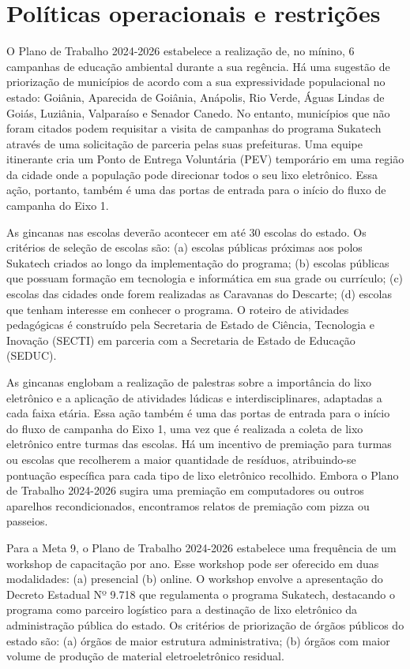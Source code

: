 \documentclass[
	12pt,				%
	openright,			%
	twoside,			%
	a4paper,			%
	english,			%
	french,				%
	spanish,			%
	brazil,				%
	]{abntex2}
\begin{document}
\section{Políticas operacionais e restrições}
O Plano de Trabalho 2024-2026 estabelece a realização de, no mínino, 6 campanhas de educação ambiental durante a sua regência. Há uma sugestão de priorização de municípios de acordo com a sua expressividade populacional no estado: Goiânia, Aparecida de Goiânia, Anápolis, Rio Verde, Águas Lindas de Goiás, Luziânia, Valparaíso e Senador Canedo. No entanto, municípios que não foram citados podem requisitar a visita de campanhas do programa Sukatech através de uma solicitação de parceria pelas suas prefeituras. Uma equipe itinerante cria um Ponto de Entrega Voluntária (PEV) temporário em uma região da cidade onde a população pode direcionar todos o seu lixo eletrônico. Essa ação, portanto, também é uma das portas de entrada para o início do fluxo de campanha do Eixo 1.

As gincanas nas escolas deverão acontecer em até 30 escolas do estado. Os critérios de seleção de escolas são: (a) escolas públicas próximas aos polos Sukatech criados ao longo da implementação do programa; (b) escolas públicas que possuam formação em tecnologia e informática em sua grade ou currículo; (c) escolas das cidades onde forem realizadas as Caravanas do Descarte; (d) escolas que tenham interesse em conhecer o programa. O roteiro de atividades pedagógicas é construído pela Secretaria de Estado de Ciência, Tecnologia e Inovação (SECTI) em parceria com a Secretaria de Estado de Educação (SEDUC).

As gincanas englobam a realização de palestras sobre a importância do lixo eletrônico e a aplicação de atividades lúdicas e interdisciplinares, adaptadas a cada faixa etária. Essa ação também é uma das portas de entrada para o início do fluxo de campanha do Eixo 1, uma vez que é realizada a coleta de lixo eletrônico entre turmas das escolas. Há um incentivo de premiação para turmas ou escolas que recolherem a maior quantidade de resíduos, atribuindo-se pontuação específica para cada tipo de lixo eletrônico recolhido. Embora o Plano de Trabalho 2024-2026 sugira uma premiação em computadores ou outros aparelhos recondicionados, encontramos relatos de premiação com pizza ou passeios.

Para a Meta 9, o Plano de Trabalho 2024-2026 estabelece uma frequência de um workshop de capacitação por ano. Esse workshop pode ser oferecido em duas modalidades: (a) presencial (b) online. O workshop envolve a apresentação do Decreto Estadual Nº 9.718 que regulamenta o programa Sukatech, destacando o programa como parceiro logístico para a destinação de lixo eletrônico da administração pública do estado. Os critérios de priorização de órgãos públicos do estado são: (a) órgãos de maior estrutura administrativa; (b) órgãos com maior volume de produção de material eletroeletrônico residual.
\end{document}
